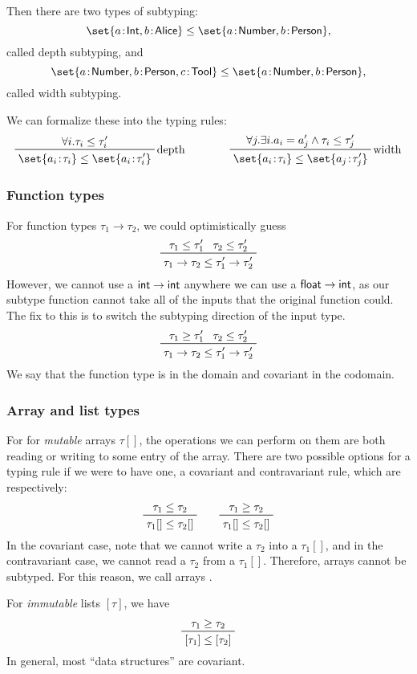 \documentclass[class=scrartcl]{standalone}
\begin{document}
Then there are two types of subtyping:
\[
  \set{a \of \textsf{Int}, b \of \textsf{Alice}}
    \leq \set{a \of \textsf{Number}, b \of \textsf{Person}},
\]
called depth subtyping, and
\[
  \set{a \of \textsf{Number}, b \of \textsf{Person}, c \of \textsf{Tool}}
    \leq \set{a \of \textsf{Number}, b \of \textsf{Person}},
\]
called width subtyping.

We can formalize these into the typing rules:
\[
  \prftree[r]{depth}
          {\forall i. \tau_i \leq \tau_i'}
          {\set{a_i \of \tau_i} \leq \set{a_i \of \tau_i'}}
  \qquad \qquad
  \prftree[r]{width}
          {\forall j. \exists i. a_i = a_j' \land \tau_i \leq \tau_j'}
          {\set{a_i \of \tau_i} \leq \set{a_j \of \tau_j'}}
\]

\subsubsection{Function types}
For function types \(\tau_1 \to \tau_2\),
we could optimistically guess
\[
  \prftree{\tau_1 \leq \tau_1'}
          {\tau_2 \leq \tau_2'}
          {\tau_1 \to \tau_2 \leq \tau_1' \to \tau_2'}
\]
However, we cannot use a \(\textsf{int} \to \textsf{int}\) anywhere we can use a
\(\textsf{float} \to \textsf{int}\), as our subtype function cannot take all
of the inputs that the original function could.
The fix to this is to switch the subtyping direction of the input type.
\[
  \prftree{\tau_1 \geq \tau_1'}
          {\tau_2 \leq \tau_2'}
          {\tau_1 \to \tau_2 \leq \tau_1' \to \tau_2'}
\]
We say that the function type is  in the domain
and covariant in the codomain.

\subsubsection{Array and list types}
For for \emph{mutable} arrays \(\tau[]\),
the operations we can perform on them are
both reading or writing to some entry of the array.
There are two possible options for a typing rule if we were to have one,
a covariant and contravariant rule, which are respectively:
\[
  \prftree{\tau_1 \leq \tau_2}
          {\tau_1[] \leq \tau_2[]} \qquad
  \prftree{\tau_1 \geq \tau_2}
          {\tau_1[] \leq \tau_2[]}
\]
In the covariant case, note that we cannot
write a \(\tau_2\) into a \(\tau_1[]\),
and in the contravariant case, we cannot
read a \(\tau_2\) from a \(\tau_1[]\).
Therefore, arrays cannot be subtyped.
For this reason, we call arrays .

For \emph{immutable} lists \([\tau]\), we have
\[
  \prftree{\tau_1 \geq \tau_2}
          {[\tau_1] \leq [\tau_2]}
\]
In general, most ``data structures'' are covariant.
\end{document}
